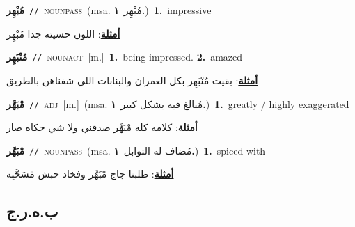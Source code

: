 \documentclass[10pt,a4paper,twoside]{article} %
\begin{document}
\begin{multicols}{2}
{\setlength\topsep{0pt}\textbf{\foreignlanguage{arabic}{مُبْهِر}}\ {\color{gray}\texttt{//}\color{black}}\ \textsc{noun\textunderscore pass}\ \color{gray}(msa. \foreignlanguage{arabic}{مُبْهِر}~\foreignlanguage{arabic}{\textbf{١.}})\color{black}\ \textbf{1.}~impressive\  \begin{flushright}\color{gray}\foreignlanguage{arabic}{\textbf{\underline{\foreignlanguage{arabic}{أمثلة}}}: اللون حسيته جدا مُبْهِر}\end{flushright}\color{black}} \vspace{2mm}

{\setlength\topsep{0pt}\textbf{\foreignlanguage{arabic}{مُنْبَهِر}}\ {\color{gray}\texttt{//}\color{black}}\ \textsc{noun\textunderscore act}\ [m.]\ \textbf{1.}~being impressed.  \textbf{2.}~amazed\  \begin{flushright}\color{gray}\foreignlanguage{arabic}{\textbf{\underline{\foreignlanguage{arabic}{أمثلة}}}: بقيت مُنْبَهِر بكل العمران والبنابات اللي شفناهن بالطريق}\end{flushright}\color{black}} \vspace{2mm}

{\setlength\topsep{0pt}\textbf{\foreignlanguage{arabic}{مْبَهَّر}}\ {\color{gray}\texttt{//}\color{black}}\ \textsc{adj}\ [m.]\ \color{gray}(msa. \foreignlanguage{arabic}{مُبالغ فيه بشكل كبير}~\foreignlanguage{arabic}{\textbf{١.}})\color{black}\ \textbf{1.}~greatly / highly exaggerated\  \begin{flushright}\color{gray}\foreignlanguage{arabic}{\textbf{\underline{\foreignlanguage{arabic}{أمثلة}}}: كلامه كله مْبَهَّر صدقني ولا شي حكاه صار}\end{flushright}\color{black}} \vspace{2mm}

{\setlength\topsep{0pt}\textbf{\foreignlanguage{arabic}{مْبَهَّر}}\ {\color{gray}\texttt{//}\color{black}}\ \textsc{noun\textunderscore pass}\ \color{gray}(msa. \foreignlanguage{arabic}{مُضاف له التوابل}~\foreignlanguage{arabic}{\textbf{١.}})\color{black}\ \textbf{1.}~spiced with\  \begin{flushright}\color{gray}\foreignlanguage{arabic}{\textbf{\underline{\foreignlanguage{arabic}{أمثلة}}}: طلبنا جاج مْبَهَّر وفخاد حبش مْسَحَّبِة}\end{flushright}\color{black}} \vspace{2mm}

\vspace{-3mm}
\subsection*{\color{blue}\foreignlanguage{arabic}{ب.ه.ر.ج}\color{blue}{}} 


\end{multicols}
\end{document}
